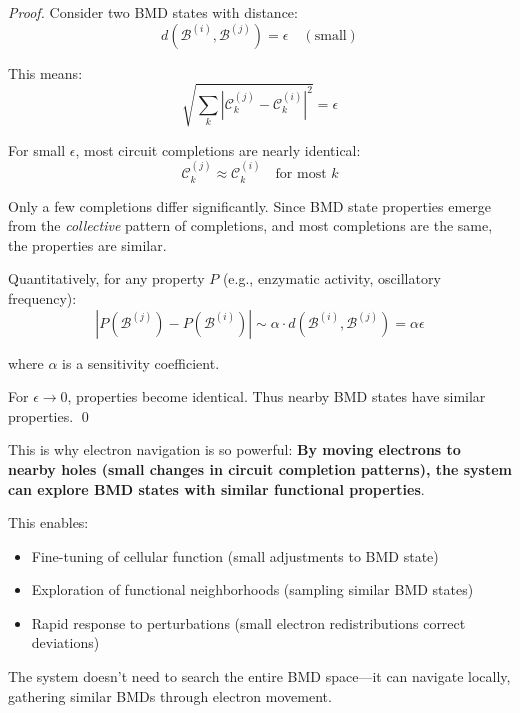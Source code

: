 \begin{proof}
Consider two BMD states with distance:
\begin{equation}
d(\mathcal{B}^{(i)}, \mathcal{B}^{(j)}) = \epsilon \quad (\text{small})
\end{equation}

This means:
\begin{equation}
\sqrt{\sum_k |\mathcal{C}_k^{(j)} - \mathcal{C}_k^{(i)}|^2} = \epsilon
\end{equation}

For small $\epsilon$, most circuit completions are nearly identical:
\begin{equation}
\mathcal{C}_k^{(j)} \approx \mathcal{C}_k^{(i)} \quad \text{for most } k
\end{equation}

Only a few completions differ significantly. Since BMD state properties emerge from the \textit{collective} pattern of completions, and most completions are the same, the properties are similar.

Quantitatively, for any property $P$ (e.g., enzymatic activity, oscillatory frequency):
\begin{equation}
|P(\mathcal{B}^{(j)}) - P(\mathcal{B}^{(i)})| \sim \alpha \cdot d(\mathcal{B}^{(i)}, \mathcal{B}^{(j)}) = \alpha \epsilon
\end{equation}

where $\alpha$ is a sensitivity coefficient.

For $\epsilon \to 0$, properties become identical. Thus nearby BMD states have similar properties. \qed
\end{proof}

\begin{remark}
This is why electron navigation is so powerful: \textbf{By moving electrons to nearby holes (small changes in circuit completion patterns), the system can explore BMD states with similar functional properties}.

This enables:
\begin{itemize}
\item Fine-tuning of cellular function (small adjustments to BMD state)
\item Exploration of functional neighborhoods (sampling similar BMD states)
\item Rapid response to perturbations (small electron redistributions correct deviations)
\end{itemize}

The system doesn't need to search the entire BMD space—it can navigate locally, gathering similar BMDs through electron movement.
\end{remark}

